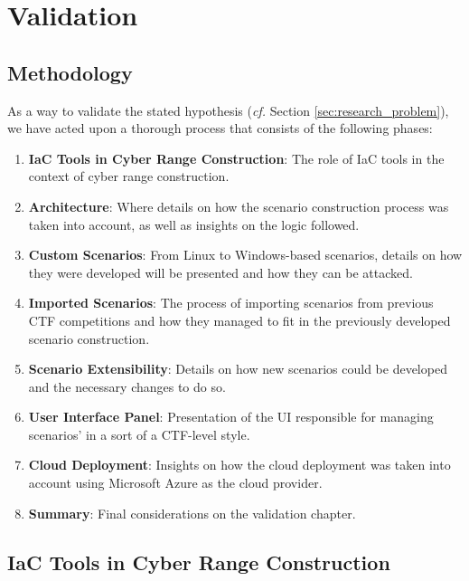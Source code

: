\chapter{Validation}\label{chap:validation}

\minitoc

\section{Methodology} \label{sec:validation_methodology}

As a way to validate the stated hypothesis (\textit{cf.} Section \ref{sec:research_problem}), we have acted upon a thorough process that consists of the following phases:

\begin{enumerate}
    \item \textbf{IaC Tools in Cyber Range Construction}: The role of IaC tools in the context of cyber range construction. %
    \item \textbf{Architecture}: Where details on how the scenario construction process was taken into account, as well as insights on the logic followed.%
    \item \textbf{Custom Scenarios}: From Linux to Windows-based scenarios, details on how they were developed will be presented and how they can be attacked.
    \item \textbf{Imported Scenarios}: The process of importing scenarios from previous CTF competitions and how they managed to fit in the previously developed scenario construction.
    \item \textbf{Scenario Extensibility}: Details on how new scenarios could be developed and the necessary changes to do so.
    \item \textbf{User Interface Panel}: Presentation of the UI responsible for managing scenarios' in a sort of a CTF-level style.
    \item \textbf{Cloud Deployment}: Insights on how the cloud deployment was taken into account using Microsoft Azure as the cloud provider.
    \item \textbf{Summary}: Final considerations on the validation chapter.
\end{enumerate}


\section{IaC Tools in Cyber Range Construction} \label{sec:validation_iac_tools_in_cr_construction}

